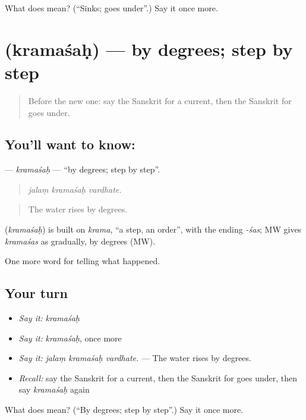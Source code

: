\begin{tcolorbox}[breakable,colback=teal!4,colframe=teal!35!black,title={Before you move on}]
What does  mean? (\textquotedblleft{}Sinks; goes under\textquotedblright{}.) Say it once more.
\end{tcolorbox}
\section[\texorpdfstring{\sk{क्रमशः} (kramaśaḥ)}{क्रमशः (kramaśaḥ)}]{ (kramaśaḥ) — by degrees; step by step}

\label{lesson:SA-C302-kramasah}



\begin{quote}
Before the new one: say the Sanskrit for a current, then the Sanskrit for goes under.
\end{quote}

\subsection*{You'll want to know: }
\textbf{} — \emph{kramaśaḥ} — \textquotedblleft{}by degrees; step by step\textquotedblright{}.

\begin{quote}
  
\end{quote}

\begin{quote}
\emph{jalaṃ kramaśaḥ vardhate.}
\end{quote}

\begin{quote}
The water rises by degrees.
\end{quote}

\begin{cousinweb}
\textbf{} (\emph{kramaśaḥ}) is built on \emph{krama}, \textquotedblleft{}a step, an order\textquotedblright{}, with the ending \emph{-śas}; MW gives \emph{kramaśas} as gradually, by degrees (MW).
\end{cousinweb}

\begin{grammarlens}[title={What you've built}]
One more word for telling what happened.
\end{grammarlens}

\subsection*{Your turn}
\begin{itemize}
\raggedright
  \item \emph{Say it:} \emph{kramaśaḥ}
  \item \emph{Say it:} \emph{kramaśaḥ}, once more
  \item \emph{Say it:} \emph{jalaṃ kramaśaḥ vardhate.} — The water rises by degrees.
  \item \emph{Recall:} say the Sanskrit for a current, then the Sanskrit for goes under, then say \emph{kramaśaḥ} again
\end{itemize}

\begin{tcolorbox}[breakable,colback=teal!4,colframe=teal!35!black,title={Before you move on}]
What does  mean? (\textquotedblleft{}By degrees; step by step\textquotedblright{}.) Say it once more.
\end{tcolorbox}
